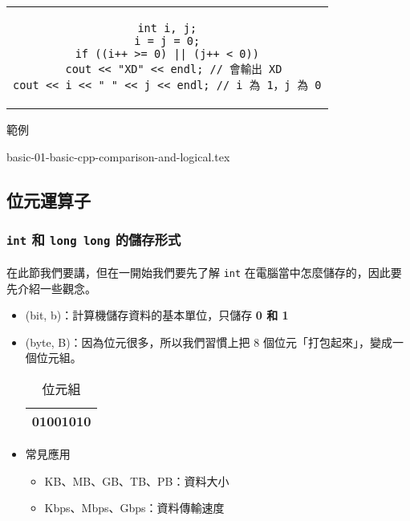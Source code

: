\documentclass[12pt,a4paper,oneside]{article}
\begin{document}
\begin{CJK}{UTF8}{bkai}
\begin{itemize}
\begin{code}[h!]
\centering
\begin{tabular}{c}
\begin{lstlisting}
int i, j;
i = j = 0;
if ((i++ >= 0) || (j++ < 0))
  cout << "XD" << endl; // 會輸出 XD
cout << i << " " << j << endl; // i 為 1，j 為 0
\end{lstlisting}
\end{tabular}
\caption{範例}
\label{basic:cpp:code:short:cut:2}
\end{code}

\end{itemize}

\label{basic:cpp:problem:comparison}
{basic-01-basic-cpp-comparison-and-logical.tex}

\subsection{位元運算子}
\subsubsection{\lstinline!int! 和 \lstinline!long long! 的儲存形式}

\paragraph{}在此節我們要講，但在一開始我們要先了解 \lstinline!int! 在電腦當中怎麼儲存的，因此要先介紹一些觀念。

\begin{itemize}
\item {} (bit, b)：計算機儲存資料的基本單位，只儲存 \textbf{0 和 1}
\item {} (byte, B)：因為位元很多，所以我們習慣上把 8 個位元「打包起來」，變成一個位元組。

\begin{table}[h]
\centering
\begin{tabular}{|c|}
\hline
01001010\\
\hline
\end{tabular}
\caption{位元組}
\label{basic:cpp:table:byte}
\end{table}

\item 常見應用
  \begin{itemize}
  \item KB、MB、GB、TB、PB：資料大小
  \item Kbps、Mbps、Gbps：資料傳輸速度
  \end{itemize}
\end{itemize}


\end{CJK}
\end{document}
